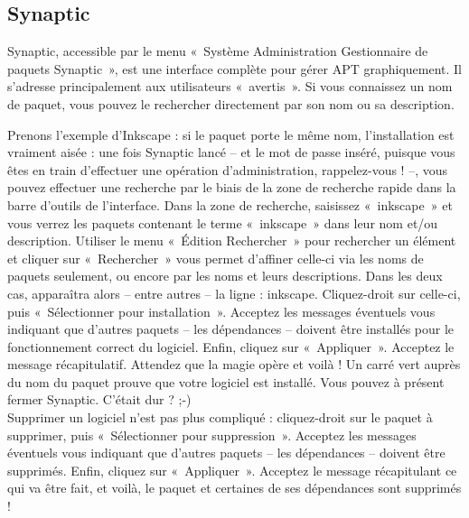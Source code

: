\subsection{Synaptic}
\label{RefInstallSynaptic}
Synaptic, accessible par le menu «~Système \FlecheDroite Administration \FlecheDroite Gestionnaire de paquets Synaptic~», est une interface complète pour gérer APT graphiquement. Il s'adresse principalement aux utilisateurs «~avertis~». Si vous connaissez un nom de paquet, vous pouvez le rechercher directement par son nom ou sa description.\par
{}
Prenons l'exemple d'Inkscape : si le paquet porte le même nom, l'installation est vraiment aisée : une fois Synaptic lancé -- et le mot de passe inséré, puisque vous êtes en train d'effectuer une opération d'administration, rappelez-vous ! --, vous pouvez effectuer une recherche par le biais de la zone de recherche rapide dans la barre d'outils de l'interface. Dans la zone de recherche, saisissez «~inkscape~» et vous verrez les paquets contenant le terme «~inkscape~» dans leur nom et/ou description. Utiliser le menu «~Édition \FlecheDroite Rechercher~» pour rechercher un élément et cliquer sur «~Rechercher~» vous permet d'affiner celle-ci via les noms de paquets seulement, ou encore par les noms et leurs descriptions. Dans les deux cas, apparaîtra alors -- entre autres -- la ligne : inkscape. Cliquez-droit sur celle-ci, puis «~Sélectionner pour installation~». Acceptez les messages éventuels vous indiquant que d'autres paquets -- les dépendances -- doivent être installés pour le fonctionnement correct du logiciel. Enfin, cliquez sur «~Appliquer~». Acceptez le message récapitulatif. Attendez que la magie opère et voilà ! Un carré vert auprès du nom du paquet prouve que votre logiciel est installé. Vous pouvez à présent fermer Synaptic. C'était dur ? ;-)\\
Supprimer un logiciel n'est pas plus compliqué : cliquez-droit sur le paquet à supprimer, puis «~Sélectionner pour suppression~». Acceptez les messages éventuels vous indiquant que d'autres paquets -- les dépendances -- doivent être supprimés. Enfin, cliquez sur «~Appliquer~». Acceptez le message récapitulant ce qui va être fait, et voilà, le paquet et certaines de ses dépendances sont supprimés !
